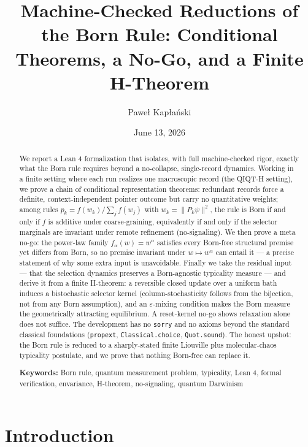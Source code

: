\documentclass[11pt,a4paper]{article}
\title{Machine-Checked Reductions of the Born Rule: Conditional Theorems, a No-Go, and a Finite H-Theorem}
\author{Paweł Kapłański}
\date{June 13, 2026}
\begin{document}
\maketitle

\begin{abstract}
\noindent We report a Lean 4 formalization that isolates, with full machine-checked rigor, exactly what the Born
rule requires beyond a no-collapse, single-record dynamics. Working in a finite setting where each run
realizes one macroscopic record (the QIQT-H setting), we prove a chain of conditional representation
theorems: redundant records force a definite, context-independent pointer outcome but carry no
quantitative weights; among rules $p_k = f(w_k)/\sum_j f(w_j)$ with $w_k=\lVert P_k\psi\rVert^2$, the rule
is Born if and only if $f$ is additive under coarse-graining, equivalently if and only if the
selector marginals are invariant under remote refinement (no-signaling). We then prove a meta no-go: the
power-law family $f_\alpha(w)=w^\alpha$ satisfies every Born-free structural premise yet differs from Born,
so no premise invariant under $w\mapsto w^\alpha$ can entail it — a precise statement of why some extra
input is unavoidable. Finally we take the residual input — that the selection dynamics preserves a
Born-agnostic typicality measure — and derive it from a finite H-theorem: a reversible closed update
over a uniform bath induces a bistochastic selector kernel (column-stochasticity follows from the bijection,
not from any Born assumption), and an $\varepsilon$-mixing condition makes the Born measure the geometrically
attracting equilibrium. A reset-kernel no-go shows relaxation alone does not suffice. The development has
no \texttt{sorry} and no axioms beyond the standard classical foundations (\texttt{propext}, \texttt{Classical.choice},
\texttt{Quot.sound}). The honest upshot: the Born rule is reduced to a sharply-stated finite Liouville plus
molecular-chaos typicality postulate, and we prove that nothing Born-free can replace it.


\medskip
\noindent\textbf{Keywords:} Born rule, quantum measurement problem, typicality, Lean 4, formal verification, envariance, H-theorem, no-signaling, quantum Darwinism
\end{abstract}

\tableofcontents
\newpage

\section{Introduction}
\end{document}
